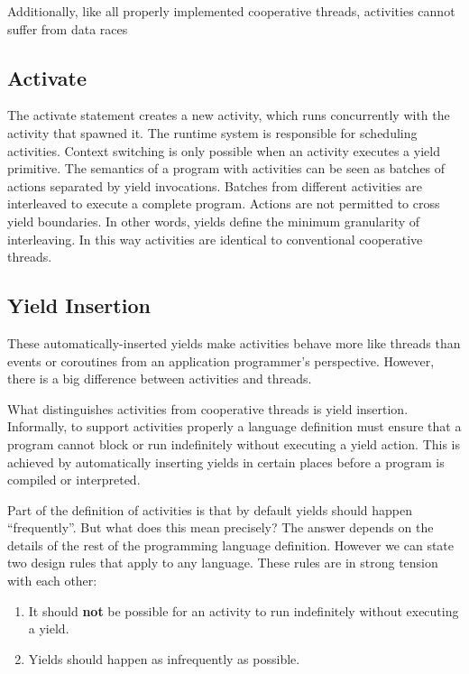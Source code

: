 \documentclass[10pt,preprint]{sigplanconf}
\begin{document}
Additionally, like all properly implemented cooperative threads, activities cannot suffer from data races

\cite{Boehm2011}

\subsection{Activate}

The activate statement creates a new activity, which runs concurrently with the activity that spawned it.
The runtime system is responsible for scheduling activities.
Context switching is only possible when an activity executes a yield primitive.
The semantics of a program with activities can be seen as batches of actions separated by yield invocations.
Batches from different activities are interleaved to execute a complete program.
Actions are not permitted to cross yield boundaries.
In other words, yields define the minimum granularity of interleaving.
In this way activities are identical to conventional cooperative threads.

\subsection{Yield Insertion}

These automatically-inserted yields make activities behave more like threads than events or coroutines from an application programmer's perspective.
However, there is a big difference between activities and threads.

%

What distinguishes activities from cooperative threads is yield insertion.
Informally, to support activities properly a language definition must ensure that a program cannot block or run indefinitely without executing a yield action.
This is achieved by automatically inserting yields in certain places before a program is compiled or interpreted.



Part of the definition of activities is that by default yields should happen ``frequently''.
But what does this mean precisely?
The answer depends on the details of the rest of the programming language definition.
However we can state two design rules that apply to any language.
These rules are in strong tension with each other:

\begin{enumerate}
\item It should \textbf{not} be possible for an activity to run indefinitely without executing a yield.
\item Yields should happen as infrequently as possible.
\end{enumerate}
\end{document}
